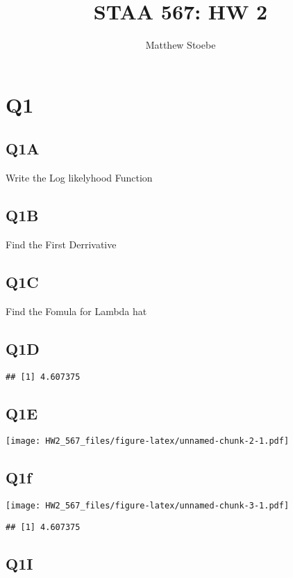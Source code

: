 \documentclass[
]{article}
\title{STAA 567: HW 2}
\author{Matthew Stoebe}
\date{}
\begin{document}
\maketitle

\section{Q1}\label{q1}

\subsection{Q1A}\label{q1a}

Write the Log likelyhood Function

\subsection{Q1B}\label{q1b}

Find the First Derrivative

\subsection{Q1C}\label{q1c}

Find the Fomula for Lambda hat

\subsection{Q1D}\label{q1d}

\begin{verbatim}
## [1] 4.607375
\end{verbatim}

\subsection{Q1E}\label{q1e}

\texttt{[image: HW2\_567\_files/figure-latex/unnamed-chunk-2-1.pdf]}

\subsection{Q1f}\label{q1f}

\texttt{[image: HW2\_567\_files/figure-latex/unnamed-chunk-3-1.pdf]}

\begin{verbatim}
## [1] 4.607375
\end{verbatim}

\subsection{Q1I}\label{q1i}
\end{document}
